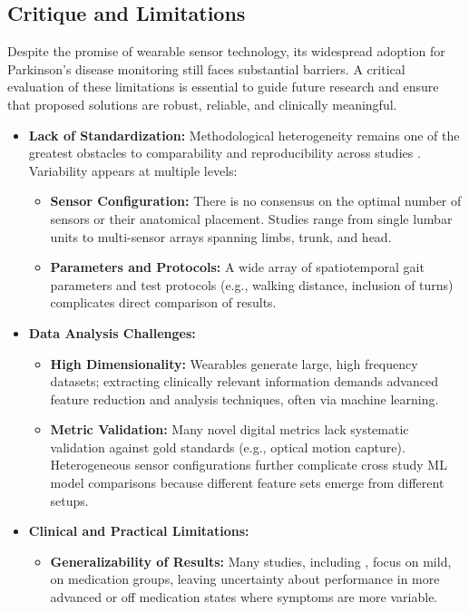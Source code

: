 \documentclass[sigconf,nonacm]{acmart}
\begin{document}
    
\subsection{Critique and Limitations}

    Despite the promise of wearable sensor technology, its widespread adoption for Parkinson's disease monitoring still faces substantial barriers. A critical evaluation of these limitations is essential to guide future research and ensure that proposed solutions are robust, reliable, and clinically meaningful.

    \begin{itemize}
        \item \textbf{Lack of Standardization:} Methodological heterogeneity remains one of the greatest obstacles to comparability and reproducibility across studies \cite{Brognara2019GaitPD}. Variability appears at multiple levels:
        \begin{itemize}
            \item \textbf{Sensor Configuration:} There is no consensus on the optimal number of sensors or their anatomical placement. Studies range from single lumbar units to multi-sensor arrays spanning limbs, trunk, and head.

            \item \textbf{Parameters and Protocols:} A wide array of spatiotemporal gait parameters and test protocols (e.g., walking distance, inclusion of turns) complicates direct comparison of results.
        \end{itemize}
        
        \item \textbf{Data Analysis Challenges:}
        \begin{itemize}
            \item \textbf{High Dimensionality:} Wearables generate large, high frequency datasets; extracting clinically relevant information demands advanced feature reduction and analysis techniques, often via machine learning.
            
            \item \textbf{Metric Validation:} Many novel digital metrics lack systematic validation against gold standards (e.g., optical motion capture). Heterogeneous sensor configurations further complicate cross study ML model comparisons because different feature sets emerge from different setups.
        \end{itemize}
        
        \item \textbf{Clinical and Practical Limitations:}
        \begin{itemize}
            \item \textbf{Generalizability of Results:} Many studies, including \cite{Schifino2025SmartwatchTremorPD}, focus on mild, on medication groups, leaving uncertainty about performance in more advanced or off medication states where symptoms are more variable.
            

\end{itemize}
\end{itemize}
\end{document}
